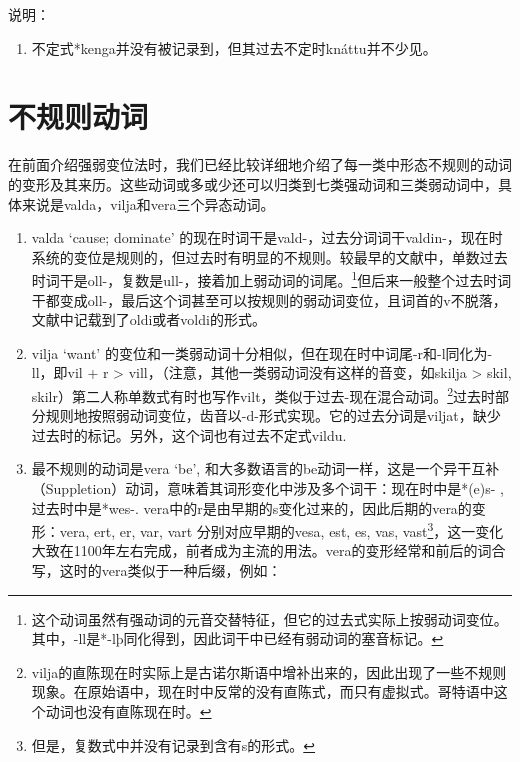 说明：

\begin{enumerate}
  \def\labelenumi{\arabic{enumi})}
  \item
        不定式*kenga并没有被记录到，但其过去不定时knáttu并不少见。
\end{enumerate}

\section{不规则动词}\label{不规则动词}

在前面介绍强弱变位法时，我们已经比较详细地介绍了每一类中形态不规则的动词的变形及其来历。这些动词或多或少还可以归类到七类强动词和三类弱动词中，具体来说是valda，vilja和vera三个异态动词。

\begin{enumerate}
  \def\labelenumi{\arabic{enumi}.}
  \item
        valda `cause; dominate‌'
        的现在时词干是vald-，过去分词词干valdin-，现在时系统的变位是规则的，但过去时有明显的不规则。较最早的文献中，单数过去时词干是oll-，复数是ull-，接着加上弱动词的词尾。\footnote{这个动词虽然有强动词的元音交替特征，但它的过去式实际上按弱动词变位。其中，-ll是*-lþ同化得到，因此词干中已经有弱动词的塞音标记。}但后来一般整个过去时词干都变成oll-，最后这个词甚至可以按规则的弱动词变位，且词首的v不脱落，文献中记载到了oldi或者voldi的形式。
  \item
        vilja `want‌'
        的变位和一类弱动词十分相似，但在现在时中词尾-r和-l同化为-ll，即vil + r
        \textgreater{} vill，（注意，其他一类弱动词没有这样的音变，如skilja
        \textgreater{} skil,
        skilr）第二人称单数式有时也写作vilt，类似于过去-现在混合动词。\footnote{vilja的直陈现在时实际上是古诺尔斯语中增补出来的，因此出现了一些不规则现象。在原始语中，现在时中反常的没有直陈式，而只有虚拟式。哥特语中这个动词也没有直陈现在时。}过去时部分规则地按照弱动词变位，齿音以-d-形式实现。它的过去分词是viljat，缺少过去时的标记。另外，这个词也有过去不定式vildu.
  \item
        最不规则的动词是vera `be‌',
        和大多数语言的be动词一样，这是一个异干互补（Suppletion）动词，意味着其词形变化中涉及多个词干：现在时中是*(e)s-
        , 过去时中是*wes-.
        vera中的r是由早期的s变化过来的，因此后期的vera的变形：vera, ert, er,
        var, vart 分别对应早期的vesa, est, es, vas,
        vast\footnote{但是，复数式中并没有记录到含有s的形式。}，这一变化大致在1100年左右完成，前者成为主流的用法。vera的变形经常和前后的词合写，这时的vera类似于一种后缀，例如：
\end{enumerate}

